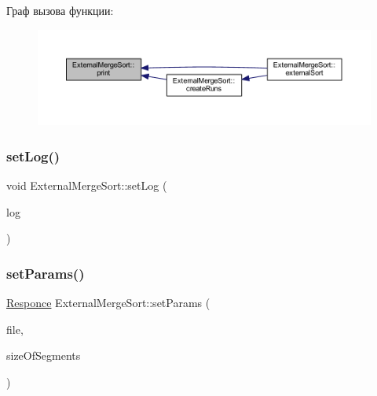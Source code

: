 Граф вызова функции\+:\nopagebreak
\begin{figure}[H]
\begin{center}
\leavevmode
\includegraphics[width=350pt]{class_external_merge_sort_a5e19d768fb9ef81e36e22e2eff498ca4_icgraph}
\end{center}
\end{figure}
\hypertarget{class_external_merge_sort_ac0eeaba67ee0703acf73a8a5bf78ebe1}{}\label{class_external_merge_sort_ac0eeaba67ee0703acf73a8a5bf78ebe1} 
\subsubsection{\texorpdfstring{set\+Log()}{setLog()}}
{\footnotesize\ttfamily void External\+Merge\+Sort\+::set\+Log (\begin{DoxyParamCaption}\item[{\hyperlink{_structures_8h_af67907baa897e9fb84df0cb89795b87c}{Log\+Type}}]{log }\end{DoxyParamCaption})}

\hypertarget{class_external_merge_sort_a2a27571acdf4f42e34798663e37f5e0b}{}\label{class_external_merge_sort_a2a27571acdf4f42e34798663e37f5e0b} 
\subsubsection{\texorpdfstring{set\+Params()}{setParams()}}
{\footnotesize\ttfamily \hyperlink{_structures_8h_a9864d6ef28dd6e38416afac4426b3491}{Responce} External\+Merge\+Sort\+::set\+Params (\begin{DoxyParamCaption}\item[{\hyperlink{class_file_manager}{File\+Manager} $\ast$}]{file,  }\item[{long long}]{size\+Of\+Segments }\end{DoxyParamCaption})}

